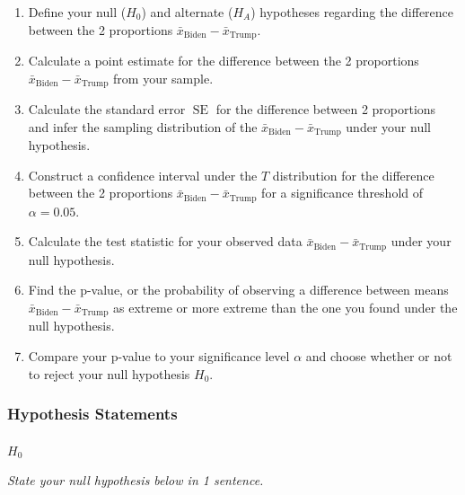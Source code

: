 \documentclass[
  letterpaper,
  DIV=11,
  numbers=noendperiod]{scrartcl}
\makeatletter
\let\oldparagraph\paragraph
\renewcommand{\paragraph}{
    \@ifstar
      \xxxParagraphStar
      \xxxParagraphNoStar
  }
\newcommand{\xxxParagraphStar}[1]{\oldparagraph*{#1}\mbox{}}
\newcommand{\xxxParagraphNoStar}[1]{\oldparagraph{#1}\mbox{}}
\makeatother
\begin{document}
\begin{enumerate}
\def\labelenumi{\arabic{enumi}.}
\item
  Define your null (\(H_0\)) and alternate (\(H_A\)) hypotheses
  regarding the difference between the 2 proportions
  \(\bar{x}_{\text{Biden}}-\bar{x}_{\text{Trump}}\).
\item
  Calculate a point estimate for the difference between the 2
  proportions \(\bar{x}_{\text{Biden}}-\bar{x}_{\text{Trump}}\) from
  your sample.
\item
  Calculate the standard error \(\operatorname{SE}\) for the difference
  between 2 proportions and infer the sampling distribution of the
  \(\bar{x}_{\text{Biden}}-\bar{x}_{\text{Trump}}\) under your null
  hypothesis.
\item
  Construct a confidence interval under the \(T\) distribution for the
  difference between the 2 proportions
  \(\bar{x}_{\text{Biden}}-\bar{x}_{\text{Trump}}\) for a significance
  threshold of \(\alpha=0.05\).
\item
  Calculate the test statistic for your observed data
  \(\bar{x}_{\text{Biden}}-\bar{x}_{\text{Trump}}\) under your null
  hypothesis.
\item
  Find the p-value, or the probability of observing a difference between
  means \(\bar{x}_{\text{Biden}}-\bar{x}_{\text{Trump}}\) as extreme or
  more extreme than the one you found under the null hypothesis.
\item
  Compare your p-value to your significance level \(\alpha\) and choose
  whether or not to reject your null hypothesis \(H_0\).
\end{enumerate}

\subsubsection{Hypothesis Statements}\label{hypothesis-statements-1}

\paragraph{\texorpdfstring{\(H_0\)}{H\_0}}\label{h_0-1}

\emph{State your null hypothesis below in 1 sentence.}
\end{document}
